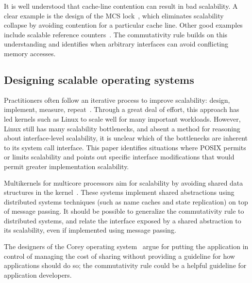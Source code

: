 
It is well understood that cache-line
contention can result in bad scalability. A clear example is the design of
the MCS lock~\cite{MCS}, which eliminates scalability collapse by avoiding
contention for a particular cache line.  Other good examples include
scalable reference counters~\cite{approx:counter,snzi:podc}.
%
The commutativity rule builds on this understanding and identifies when
arbitrary interfaces can avoid conflicting memory accesses.

\subsection{Designing scalable operating systems}

Practitioners often follow an iterative process to
improve scalability: design, implement, measure, 
repeat~\cite{cacm-real-world}.
%
Through a great deal of effort,
this approach has led kernels such as Linux to scale well
for many important workloads. However, Linux still has many
scalability bottlenecks, and absent a method for reasoning about
interface-level scalability, it is unclear which of the bottlenecks
are inherent to its system call interface.  This paper identifies situations
where POSIX permits or limits scalability and points out specific interface
modifications that would permit greater implementation scalability.

Multikernels for multicore processors aim for scalability by avoiding shared
data structures in the kernel~\cite{barrelfish:sosp,wentzlaff:fos}.  These
systems implement shared abstractions using distributed systems techniques (such
as name caches and state replication) on top of message passing.  It should be
possible to generalize the commutativity rule to distributed systems, and relate
the interface exposed by a shared abstraction to its scalability, even if
implemented using message passing.

The designers of the Corey operating system~\cite{boyd-wickizer:corey} argue for
putting the application in control of managing the cost of sharing without
providing a guideline for how applications should do so;
the commutativity rule could be a helpful guideline
for application developers.

